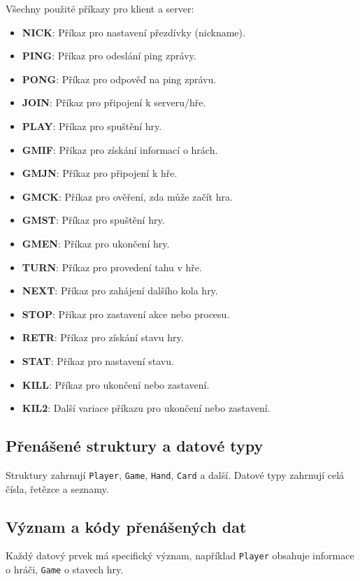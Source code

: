 \documentclass{article}
\begin{document}
Všechny použité příkazy pro klient a server:
\begin{itemize}
    \item \textbf{NICK}: Příkaz pro nastavení přezdívky (nickname).
    \item \textbf{PING}: Příkaz pro odeslání ping zprávy.
    \item \textbf{PONG}: Příkaz pro odpověď na ping zprávu.
    \item \textbf{JOIN}: Příkaz pro připojení k serveru/hře.
    \item \textbf{PLAY}: Příkaz pro spuštění hry.
    \item \textbf{GMIF}: Příkaz pro získání informací o hrách.
    \item \textbf{GMJN}: Příkaz pro připojení k hře.
    \item \textbf{GMCK}: Příkaz pro ověření, zda může začít hra.
    \item \textbf{GMST}: Příkaz pro spuštění hry.
    \item \textbf{GMEN}: Příkaz pro ukončení hry.
    \item \textbf{TURN}: Příkaz pro provedení tahu v hře.
    \item \textbf{NEXT}: Příkaz pro zahájení dalšího kola hry.
    \item \textbf{STOP}: Příkaz pro zastavení akce nebo procesu.
    \item \textbf{RETR}: Příkaz pro získání stavu hry.
    \item \textbf{STAT}: Příkaz pro nastavení stavu.
    \item \textbf{KILL}: Příkaz pro ukončení nebo zastavení.
    \item \textbf{KIL2}: Další variace příkazu pro ukončení nebo zastavení.
\end{itemize}

\subsection{Přenášené struktury a datové typy}
Struktury zahrnují \texttt{Player}, \texttt{Game}, \texttt{Hand}, \texttt{Card} a další. Datové typy zahrnují celá čísla, řetězce a seznamy.

\subsection{Význam a kódy přenášených dat}
Každý datový prvek má specifický význam, například \texttt{Player} obsahuje informace o hráči, \texttt{Game} o stavech hry.
\end{document}
